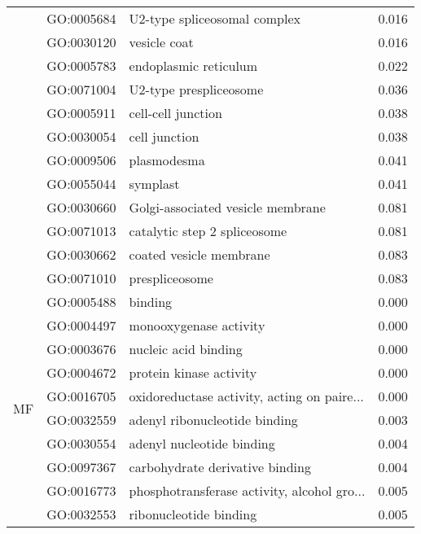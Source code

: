 \begin{longtable}{lllr}
   & GO:0005684 &                 U2-type spliceosomal complex &         0.016 \\
   & GO:0030120 &                                 vesicle coat &         0.016 \\
   & GO:0005783 &                        endoplasmic reticulum &         0.022 \\
   & GO:0071004 &                       U2-type prespliceosome &         0.036 \\
   & GO:0005911 &                           cell-cell junction &         0.038 \\
   & GO:0030054 &                                cell junction &         0.038 \\
   & GO:0009506 &                                  plasmodesma &         0.041 \\
   & GO:0055044 &                                     symplast &         0.041 \\
   & GO:0030660 &            Golgi-associated vesicle membrane &         0.081 \\
   & GO:0071013 &                 catalytic step 2 spliceosome &         0.081 \\
   & GO:0030662 &                      coated vesicle membrane &         0.083 \\
   & GO:0071010 &                               prespliceosome &         0.083 \\
\cline{1-4}
\multirow{45}{*}{MF} & GO:0005488 &                                      binding &         0.000 \\
   & GO:0004497 &                       monooxygenase activity &         0.000 \\
   & GO:0003676 &                         nucleic acid binding &         0.000 \\
   & GO:0004672 &                      protein kinase activity &         0.000 \\
   & GO:0016705 &  oxidoreductase activity, acting on paire... &         0.000 \\
   & GO:0032559 &                adenyl ribonucleotide binding &         0.003 \\
   & GO:0030554 &                    adenyl nucleotide binding &         0.004 \\
   & GO:0097367 &              carbohydrate derivative binding &         0.004 \\
   & GO:0016773 &  phosphotransferase activity, alcohol gro... &         0.005 \\
   & GO:0032553 &                       ribonucleotide binding &         0.005 \\

\end{longtable}
